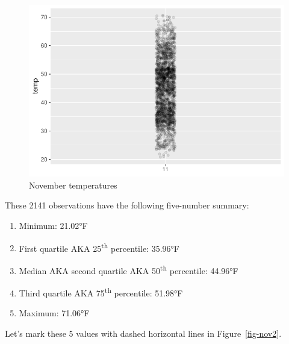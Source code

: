 \documentclass[
  letterpaper,
  DIV=11,
  numbers=noendperiod]{scrreprt}
\providecommand{\tightlist}{%
  \setlength{\itemsep}{0pt}\setlength{\parskip}{0pt}}\usepackage{longtable,booktabs,array}
\theoremstyle{definition}
\theoremstyle{remark}
\begin{document}
\begin{figure}

{\centering \includegraphics{02-visualization_files/figure-pdf/fig-nov1-1.pdf}

}

\caption{\label{fig-nov1}November temperatures}

\end{figure}

These 2141 observations have the following five-number summary:

\begin{enumerate}
\def\labelenumi{\arabic{enumi}.}
\tightlist
\item
  Minimum: 21.02°F
\item
  First quartile AKA 25\textsuperscript{th} percentile: 35.96°F
\item
  Median AKA second quartile AKA 50\textsuperscript{th} percentile:
  44.96°F
\item
  Third quartile AKA 75\textsuperscript{th} percentile: 51.98°F
\item
  Maximum: 71.06°F
\end{enumerate}

Let's mark these 5 values with dashed horizontal lines in
Figure~\ref{fig-nov2}.
\end{document}
